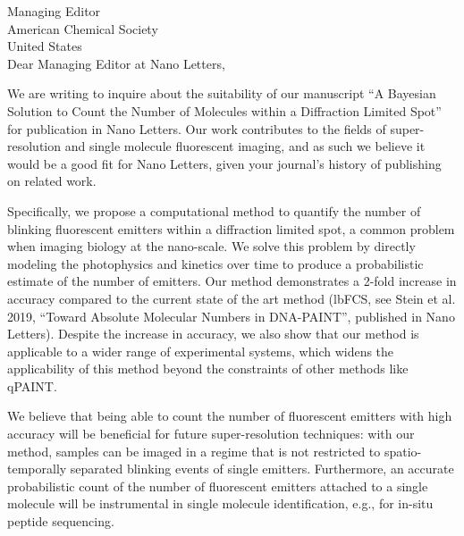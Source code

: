 \documentclass{article}
\date{\today}
\begin{document}
\thispagestyle{empty}
Managing Editor\\
American Chemical Society\\
United States\\

\vspace{5mm}
Dear Managing Editor at Nano Letters,


We are writing to inquire about the suitability of our manuscript
``A Bayesian Solution to Count the Number of Molecules within a Diffraction Limited Spot''
for publication in Nano Letters. 
%
%
Our work contributes to the fields of super-resolution and single molecule
fluorescent imaging, and as such we believe it would be a good fit for Nano
Letters, given your journal's history of publishing on related work.
%

Specifically, we propose a computational method to quantify the number of
blinking fluorescent emitters within a diffraction limited spot, a common
problem when imaging biology at the nano-scale.
%
We solve this problem by directly modeling the photophysics and kinetics over
time to produce a probabilistic estimate of the number of emitters.
%
Our method demonstrates a 2-fold increase in accuracy compared to the current
state of the art method (lbFCS, see Stein et al. 2019, ``Toward Absolute
Molecular Numbers in DNA-PAINT'', published in Nano Letters). Despite the
increase in accuracy, we also show that our method is applicable to a wider
range of experimental systems, which widens the applicability of this method
beyond the constraints of other methods like qPAINT.

We believe that being able to count the number of fluorescent emitters with
high accuracy will be beneficial for future super-resolution techniques: with
our method, samples can be imaged in a regime that is not restricted to
spatio-temporally separated blinking events of single emitters. Furthermore, an
accurate probabilistic count of the number of fluorescent emitters attached to
a single molecule will be instrumental in single molecule identification, e.g.,
for in-situ peptide sequencing.
\end{document}
